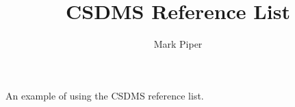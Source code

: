 \documentclass[11pt]{article}
\begin{document}
\title{CSDMS Reference List}
\author{Mark Piper}
\maketitle

An example of using the CSDMS reference list.

\cite{tucker:2010}
\cite{overeem:2015a}
\cite{kettner:2008}
\cite{hutton:2008}
\cite{piper:2015}
\cite{blanca:2017}
\cite{jupyter:2015}
\cite{gdal:2017}


\end{document}
